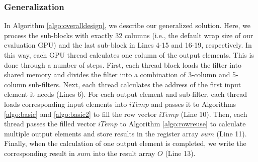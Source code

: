 \subsubsection{Generalization} In Algorithm \ref{algo:overalldesign}, we describe our generalized solution. Here, we process the sub-blocks
with exactly 32 columns (i.e., the default wrap size of our evaluation GPU) and the last sub-block in Lines 4-15 and 16-19, respectively.
In this way, each GPU thread calculates one column of the output elements. This is done through a number of steps. First, each thread block
loads the filter into shared memory and divides the filter into a combination of 3-column and 5-column sub-filters. Next, each thread
calculates the address of the first input element it needs (Lines 6). For each output element and sub-filter, each thread loads
corresponding input elements into $iTemp$ and passes it to Algorithms \ref{algo:basic} and \ref{algo:basic2} to fill the row vector $iTemp$
(Line 10). Then, each thread passes the filled vector $iTemp$ to Algorithm \ref{algo:rowreuse} to calculate multiple output elements and
store results in the register array $sum$ (Line 11). Finally, when the calculation of one output element is completed, we write the
corresponding result in $sum$ into the result array $O$ (Line 13).
